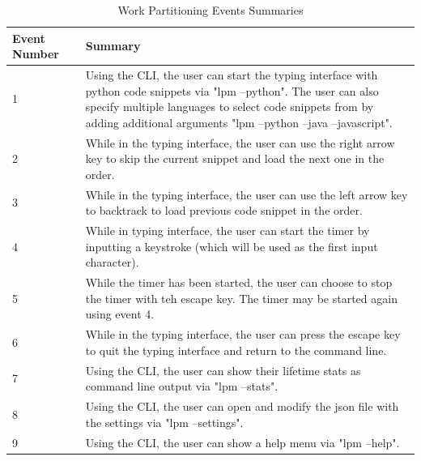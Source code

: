 \documentclass[12pt, titlepage]{article}
\begin{document}
\begin{table}[h]
    \centering
    \begin{tabular}{| p{0.18\linewidth} | p{0.82\linewidth} |}
        \hline
        Event Number & Summary \\
        \hline
        1 & Using the CLI, the user can start the typing interface with python code snippets via "lpm --python". The user can also specify multiple languages to select code snippets from by adding additional arguments "lpm --python --java --javascript".\\
        \hline
        2 & While in the typing interface, the user can use the right arrow key to skip the current snippet and load the next one in the order.\\
        \hline
        3 & While in the typing interface, the user can use the left arrow key to backtrack to load previous code snippet in the order.\\
        \hline
        4 & While in typing interface, the user can start the timer by inputting a keystroke (which will be used as the first input character).\\
        \hline
        5 & While the timer has been started, the user can choose to stop the timer with teh escape key. The timer may be started again using event 4.\\
        \hline
        6 & While in the typing interface, the user can press the escape key to quit the typing interface and return to the command line.\\
        \hline
        7 & Using the CLI, the user can show their lifetime stats as command line output via "lpm --stats".\\
        \hline
        8 & Using the CLI, the user can open and modify the json file with the settings via "lpm --settings".\\
        \hline
        9 & Using the CLI, the user can show a help menu via "lpm --help".\\
        \hline
    \end{tabular}
    \caption{Work Partitioning Events Summaries}
    \label{tab:workpartsummary}
\end{table}

\newpage
\end{document}
